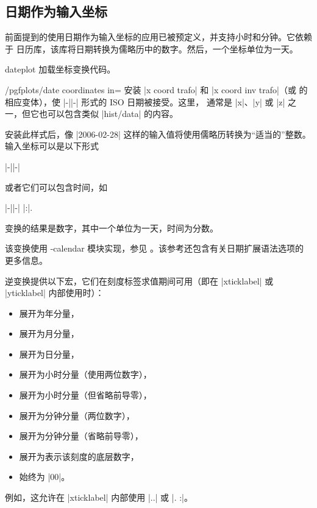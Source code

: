 \subsection{日期作为输入坐标}
\label{sec:pgfplots:date:coords}

{
\def\pgfplotsmanualcurlibrary{dateplot}

前面提到的使用日期作为输入坐标的应用已被预定义，并支持小时和分钟。它依赖于 \pgfname{} 日历库，该库将日期转换为儒略历中的数字。然后，一个坐标单位为一天。

\begin{pgfplotslibrary}{dateplot}
    加载坐标变换代码。
\end{pgfplotslibrary}

\begin{stylekey}{/pgfplots/date coordinates in=}
    安装 |x coord trafo| 和 |x coord inv trafo|（或  的相应变体），使 |-||-| 形式的 ISO 日期被接受。这里， 通常是 |x|、|y| 或 |z| 之一，但它也可以包含类似 |hist/data| 的内容。

    安装此样式后，像 |2006-02-28| 这样的输入值将使用儒略历转换为“适当的”整数。输入坐标可以是以下形式

        |-||-|

    \noindent 或者它们可以包含时间，如

        |-||-| |:|.

    变换的结果是数字，其中一个单位为一天，时间为分数。

    该变换使用 \pgfname-calendar 模块实现，参见 \cite[Calendar Library]{tikz}。该参考还包含有关日期扩展语法选项的更多信息。

    逆变换提供以下宏，它们在刻度标签求值期间可用（即在 |xticklabel| 或 |yticklabel| 内部使用时）：
    \begin{itemize}
        \item \declareandlabel{\year} 展开为年分量，
        \item \declareandlabel{\month} 展开为月分量，
        \item \declareandlabel{\day} 展开为日分量，
        \item \declareandlabel{\hour} 展开为小时分量（使用两位数字），
        \item \declareandlabel{\Hour} 展开为小时分量（但省略前导零），
        \item \declareandlabel{\minute} 展开为分钟分量（两位数字），
        \item \declareandlabel{\Minute} 展开为分钟分量（省略前导零），
        \item \declareandlabel{\lowlevel} 展开为表示该刻度的底层数字，
        \item \declareandlabel{\second} 始终为 |00|。
    \end{itemize}
    例如，这允许在 |xticklabel| 内部使用 |\day.\month.\year| 或 |\day. \hour:\minute|。


\end{stylekey}}
